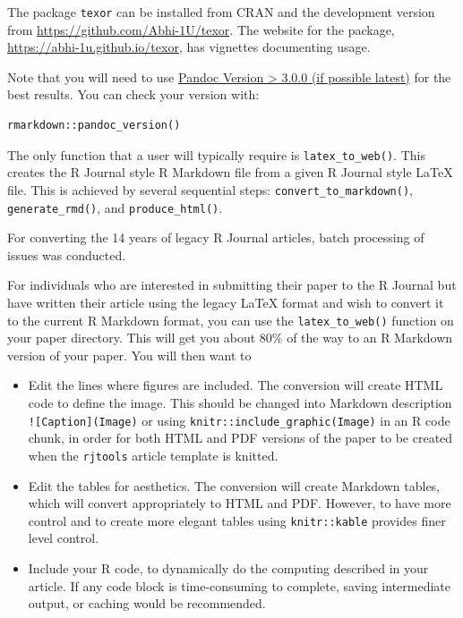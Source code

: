 The package \texttt{texor} can be installed from CRAN and the development version from \url{https://github.com/Abhi-1U/texor}. The website for the package, \url{https://abhi-1u.github.io/texor}, has vignettes documenting usage.

Note that you will need to use \href{(https://pandoc.org/installing.html)}{Pandoc Version \textgreater{} 3.0.0 (if possible latest)} for the best results. You can check your version with:

\begin{verbatim}
rmarkdown::pandoc_version()
\end{verbatim}

The only function that a user will typically require is \texttt{latex\_to\_web()}. This creates the R Journal style R Markdown file from a given R Journal style LaTeX file.
This is achieved by several sequential steps: \texttt{convert\_to\_markdown()}, \texttt{generate\_rmd()}, and \texttt{produce\_html()}.

For converting the 14 years of legacy R Journal articles, batch processing of issues was conducted.

For individuals who are interested in submitting their paper to the R Journal but have written their article using the legacy LaTeX format and wish to convert it to the current R Markdown format, you can use the \texttt{latex\_to\_web()} function on your paper directory. This will get you about 80\% of the way to an R Markdown version of your paper. You will then want to

\begin{itemize}
\tightlist
\item
  Edit the lines where figures are included. The conversion will create HTML code to define the image. This should be changed into Markdown description \texttt{!{[}Caption{]}(Image)} or using \texttt{knitr::include\_graphic(Image)} in an R code chunk, in order for both HTML and PDF versions of the paper to be created when the \texttt{rjtools} article template is knitted.\\
\item
  Edit the tables for aesthetics. The conversion will create Markdown tables, which will convert appropriately to HTML and PDF. However, to have more control and to create more elegant tables using \texttt{knitr::kable} provides finer level control.
\item
  Include your R code, to dynamically do the computing described in your article. If any code block is time-consuming to complete, saving intermediate output, or caching would be recommended.
\end{itemize}

